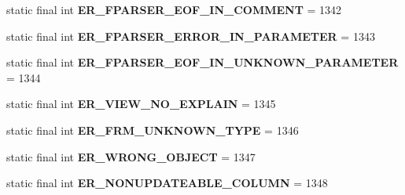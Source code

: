 \begin{DoxyCompactItemize}
\item 
\mbox{\label{classcom_1_1mysql_1_1jdbc_1_1_mysql_error_numbers_ad499a2f2955d9a40edc219ec1b9d7900}} 
static final int {\bfseries E\+R\+\_\+\+F\+P\+A\+R\+S\+E\+R\+\_\+\+E\+O\+F\+\_\+\+I\+N\+\_\+\+C\+O\+M\+M\+E\+NT} = 1342
\item 
\mbox{\label{classcom_1_1mysql_1_1jdbc_1_1_mysql_error_numbers_a3d7243655c91d73e3a2f2a31608077fe}} 
static final int {\bfseries E\+R\+\_\+\+F\+P\+A\+R\+S\+E\+R\+\_\+\+E\+R\+R\+O\+R\+\_\+\+I\+N\+\_\+\+P\+A\+R\+A\+M\+E\+T\+ER} = 1343
\item 
\mbox{\label{classcom_1_1mysql_1_1jdbc_1_1_mysql_error_numbers_a774b8c3f0d24276afdf93c892b1d671e}} 
static final int {\bfseries E\+R\+\_\+\+F\+P\+A\+R\+S\+E\+R\+\_\+\+E\+O\+F\+\_\+\+I\+N\+\_\+\+U\+N\+K\+N\+O\+W\+N\+\_\+\+P\+A\+R\+A\+M\+E\+T\+ER} = 1344
\item 
\mbox{\label{classcom_1_1mysql_1_1jdbc_1_1_mysql_error_numbers_ae15f554a1fe4141c370a6621addc30d7}} 
static final int {\bfseries E\+R\+\_\+\+V\+I\+E\+W\+\_\+\+N\+O\+\_\+\+E\+X\+P\+L\+A\+IN} = 1345
\item 
\mbox{\label{classcom_1_1mysql_1_1jdbc_1_1_mysql_error_numbers_a238e24d9e20a41947c73233379724404}} 
static final int {\bfseries E\+R\+\_\+\+F\+R\+M\+\_\+\+U\+N\+K\+N\+O\+W\+N\+\_\+\+T\+Y\+PE} = 1346
\item 
\mbox{\label{classcom_1_1mysql_1_1jdbc_1_1_mysql_error_numbers_aa9573b6363a4990eda55af35a93b46d2}} 
static final int {\bfseries E\+R\+\_\+\+W\+R\+O\+N\+G\+\_\+\+O\+B\+J\+E\+CT} = 1347
\item 
\mbox{\label{classcom_1_1mysql_1_1jdbc_1_1_mysql_error_numbers_abcb4c866c068ef2244843c11b6534003}} 
static final int {\bfseries E\+R\+\_\+\+N\+O\+N\+U\+P\+D\+A\+T\+E\+A\+B\+L\+E\+\_\+\+C\+O\+L\+U\+MN} = 1348
\item 
\mbox{\label{classcom_1_1mysql_1_1jdbc_1_1_mysql_error_numbers_aac0fce478fd593d488f33c33fc7dd7ff}} 

\end{DoxyCompactItemize}
